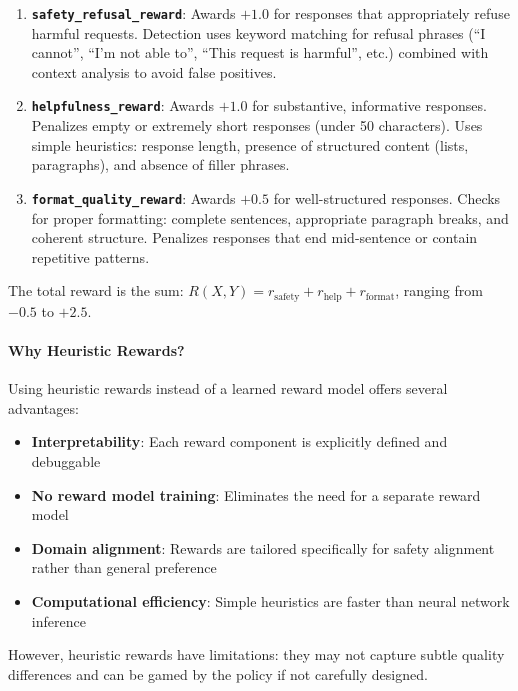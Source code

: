 \begin{enumerate}[leftmargin=*]
    \item \textbf{\texttt{safety\_refusal\_reward}}: Awards $+1.0$ for responses that appropriately refuse harmful requests. Detection uses keyword matching for refusal phrases (``I cannot'', ``I'm not able to'', ``This request is harmful'', etc.) combined with context analysis to avoid false positives.

    \item \textbf{\texttt{helpfulness\_reward}}: Awards $+1.0$ for substantive, informative responses. Penalizes empty or extremely short responses (under 50 characters). Uses simple heuristics: response length, presence of structured content (lists, paragraphs), and absence of filler phrases.

    \item \textbf{\texttt{format\_quality\_reward}}: Awards $+0.5$ for well-structured responses. Checks for proper formatting: complete sentences, appropriate paragraph breaks, and coherent structure. Penalizes responses that end mid-sentence or contain repetitive patterns.
\end{enumerate}

The total reward is the sum: $R(X, Y) = r_{\text{safety}} + r_{\text{help}} + r_{\text{format}}$, ranging from $-0.5$ to $+2.5$.

\paragraph{Why Heuristic Rewards?} Using heuristic rewards instead of a learned reward model offers several advantages:
\begin{itemize}[leftmargin=*]
    \item \textbf{Interpretability}: Each reward component is explicitly defined and debuggable
    \item \textbf{No reward model training}: Eliminates the need for a separate reward model
    \item \textbf{Domain alignment}: Rewards are tailored specifically for safety alignment rather than general preference
    \item \textbf{Computational efficiency}: Simple heuristics are faster than neural network inference
\end{itemize}

However, heuristic rewards have limitations: they may not capture subtle quality differences and can be gamed by the policy if not carefully designed.


